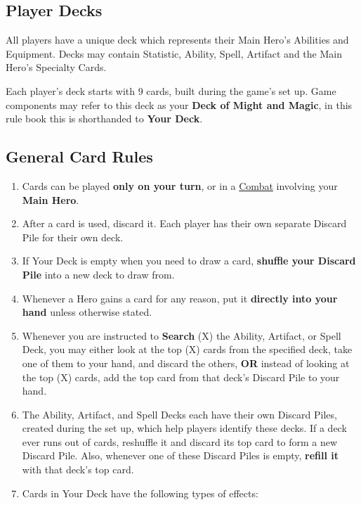 
\begin{multicols*}{2}

\subsection*{\hypertarget{Playerdecks}{Player Decks}}
All players have a unique deck which represents their Main Hero's Abilities and Equipment.
Decks may contain Statistic, Ability, Spell, Artifact and the Main Hero's Specialty Cards.

Each player's deck starts with 9 cards, built during the game's set up.
Game components may refer to this deck as your \textbf{Deck of Might and Magic}, in this rule book this is shorthanded to \textbf{Your Deck}.
\subsection*{General Card Rules}
\begin{enumerate}
  \item Cards can be played \textbf{only on your turn}, or in a \hyperlink{Combat}{Combat} involving your \textbf{Main Hero}.
  \item After a card is used, discard it.
    Each player has their own separate Discard Pile for their own deck.
  \item If Your Deck is empty when you need to draw a card, \textbf{shuffle your Discard Pile} into a new deck to draw from.
  \item Whenever a Hero gains a card for any reason, put it \textbf{directly into your hand} unless otherwise stated.
  \item Whenever you are instructed to \textbf{Search} (X) the Ability, Artifact, or Spell Deck, you may either look at the top (X) cards from the specified deck, take one of them to your hand, and discard the others, \textbf{OR} instead of looking at the top (X) cards, add the top card from that deck's Discard Pile to your hand.
  \item The Ability, Artifact, and Spell Decks each have their own Discard Piles, created during the set up, which help players identify these decks.
    If a deck ever runs out of cards, reshuffle it and discard its top card to form a new Discard Pile.
    Also, whenever one of these Discard Piles is empty, \textbf{refill it} with that deck's top card.
  \item Cards in Your Deck have the following types of effects:

\end{enumerate}
\end{multicols*}
